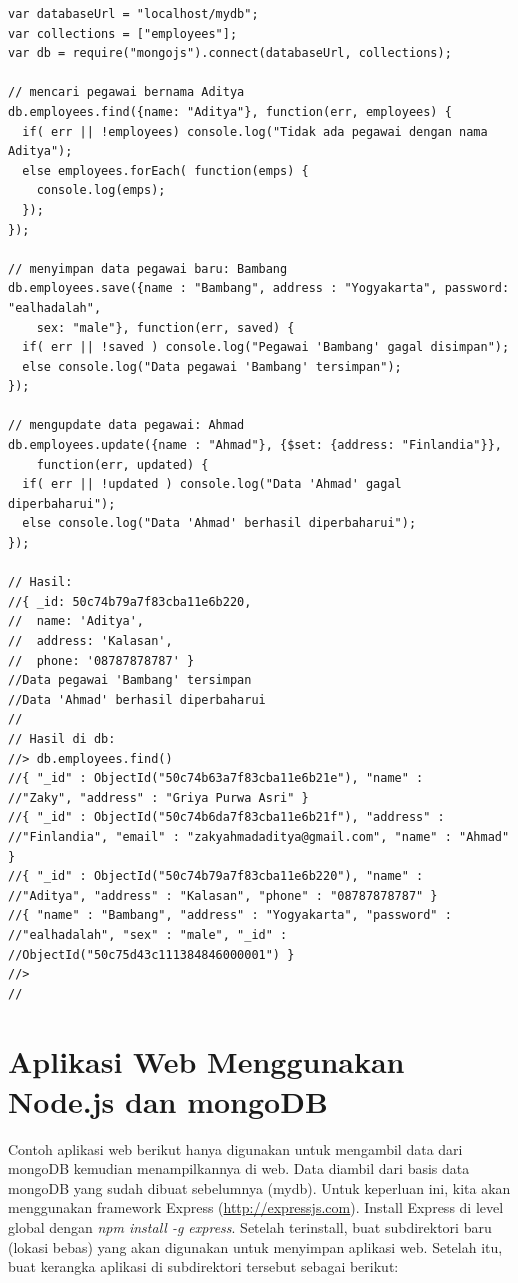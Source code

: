 \lstset{language=bash,caption=Mengakses mongoDB dari Node.js}
\begin{lstlisting}
var databaseUrl = "localhost/mydb";
var collections = ["employees"];
var db = require("mongojs").connect(databaseUrl, collections);

// mencari pegawai bernama Aditya
db.employees.find({name: "Aditya"}, function(err, employees) {
  if( err || !employees) console.log("Tidak ada pegawai dengan nama Aditya");
  else employees.forEach( function(emps) {
    console.log(emps);
  });
});

// menyimpan data pegawai baru: Bambang
db.employees.save({name : "Bambang", address : "Yogyakarta", password: "ealhadalah", 
	sex: "male"}, function(err, saved) {
  if( err || !saved ) console.log("Pegawai 'Bambang' gagal disimpan");
  else console.log("Data pegawai 'Bambang' tersimpan");
});

// mengupdate data pegawai: Ahmad
db.employees.update({name : "Ahmad"}, {$set: {address: "Finlandia"}}, 
	function(err, updated) {
  if( err || !updated ) console.log("Data 'Ahmad' gagal diperbaharui");
  else console.log("Data 'Ahmad' berhasil diperbaharui");
});

// Hasil:
//{ _id: 50c74b79a7f83cba11e6b220,
//  name: 'Aditya',
//  address: 'Kalasan',
//  phone: '08787878787' }
//Data pegawai 'Bambang' tersimpan
//Data 'Ahmad' berhasil diperbaharui
//
// Hasil di db:
//> db.employees.find()
//{ "_id" : ObjectId("50c74b63a7f83cba11e6b21e"), "name" : 
//"Zaky", "address" : "Griya Purwa Asri" }
//{ "_id" : ObjectId("50c74b6da7f83cba11e6b21f"), "address" :
//"Finlandia", "email" : "zakyahmadaditya@gmail.com", "name" : "Ahmad" }
//{ "_id" : ObjectId("50c74b79a7f83cba11e6b220"), "name" :
//"Aditya", "address" : "Kalasan", "phone" : "08787878787" }
//{ "name" : "Bambang", "address" : "Yogyakarta", "password" : 
//"ealhadalah", "sex" : "male", "_id" : 
//ObjectId("50c75d43c111384846000001") }
//> 
//  
\end{lstlisting}

\section{Aplikasi Web Menggunakan Node.js dan mongoDB}

Contoh aplikasi web berikut hanya digunakan untuk mengambil data dari mongoDB kemudian menampilkannya di web. Data diambil dari basis data mongoDB yang sudah dibuat sebelumnya (mydb). Untuk keperluan ini, kita akan menggunakan framework Express (\url{http://expressjs.com}). Install Express di level global dengan \textit{npm install -g express}. Setelah terinstall, buat subdirektori baru (lokasi bebas) yang akan digunakan untuk menyimpan aplikasi web. Setelah itu, buat kerangka aplikasi di subdirektori tersebut sebagai berikut:

